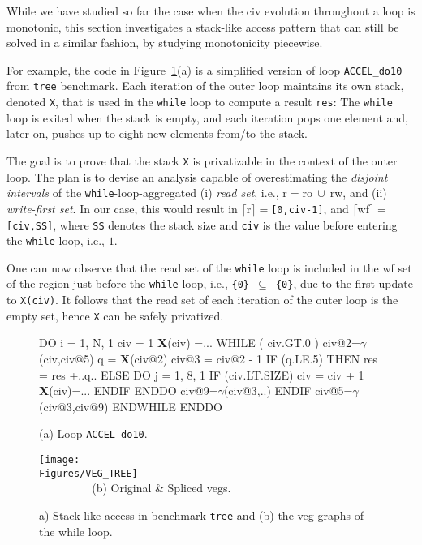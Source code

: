 \documentclass[10pt,nocopyrightspace]{sigplanconf}
\newcommand{\mymath}[1]{$ #1 $}
\newcommand{\Figures}[1]{../Figures/}
\begin{document}
While we have studied so far the case when the {\sc civ} evolution
throughout a loop is monotonic, this section investigates a stack-like 
access pattern that can still be solved in a similar fashion, by 
studying monotonicity piecewise.
 
For example, the code in Figure~\ref{fig:Tree}(a) is a simplified
version of loop {\tt ACCEL\_do10} from {\tt tree} benchmark. 
Each iteration of the outer loop maintains its own
stack, denoted {\tt X}, that is used in the {\tt while} loop to 
compute a result {\tt res}:
The {\tt while} loop is exited when the stack is empty, and each
iteration pops one element and, later on, pushes
up-to-eight new elements from/to the stack. 

The goal is to prove that the stack {\tt X} is privatizable in the
context of the outer loop.   The plan is to devise an analysis
capable of overestimating the {\em disjoint intervals} of the
{\tt while}-loop-aggregated (i) {\em read set}, i.e., 
{\sc r}$=${\sc ro}$~\cup~${\sc rw}, and (ii) {\em write-first set}. 
In our case, this would result in  
$\lceil${\sc r}$\rceil=${\tt[0,civ-1]}, and
$\lceil${\sc wf}$\rceil=${\tt[civ,SS]}, where {\tt SS} denotes
the stack size and  {\tt civ} is the value before entering the 
{\tt while} loop, i.e., $1$.  

One can now observe that the read set of the {\tt while} loop 
is included in the {\sc wf} set of the region just before the 
{\tt while} loop, i.e., {\tt \{0\} $\subseteq$ \{0\}}, due to the 
first update to {\tt X(civ)}. It follows that the read set of
each iteration of the outer loop is the empty set, 
hence {\tt X} can be safely privatized. 


\begin{figure}
\begin{minipage}{0.4\columnwidth}
\begin{colorcode}
DO i = 1, N, 1
 civ = 1
 {\bf{}X}(civ) =...
 WHILE ( civ.GT.0 )
  civ@2=\mymath{\gamma}(civ,civ@5)
  q = {\bf X}(civ@2)
  civ@3 = civ@2 - 1
  IF (q.LE.5) THEN
   res = res +..q..
  ELSE
   DO j = 1, 8, 1
    IF (civ.LT.SIZE) 
      civ = civ + 1
      {\bf{}X}(civ)=...
   ENDIF ENDDO
   civ@9=\mymath{\gamma}(civ@3,..)
  ENDIF
  civ@5=\mymath{\gamma}(civ@3,civ@9)
ENDWHILE ENDDO   
\end{colorcode}
\vspace{-1ex}
(a) Loop {\tt ACCEL\_do10}.
\end{minipage}
\begin{minipage}{0.56\columnwidth}
\texttt{[image: \\Figures/VEG\_TREE]}\\
$\mbox{ }\mbox{ }\mbox{ }\mbox{ }\mbox{ }\mbox{ }\mbox{ }$(b) Original \& Spliced {\sc veg}s.
\end{minipage}
\caption{a) Stack-like access in benchmark {\tt tree} and (b) the {\sc veg} graphs of the while loop.}
\vspace{-1ex}
\label{fig:Tree} %
\end{figure}
\end{document}
